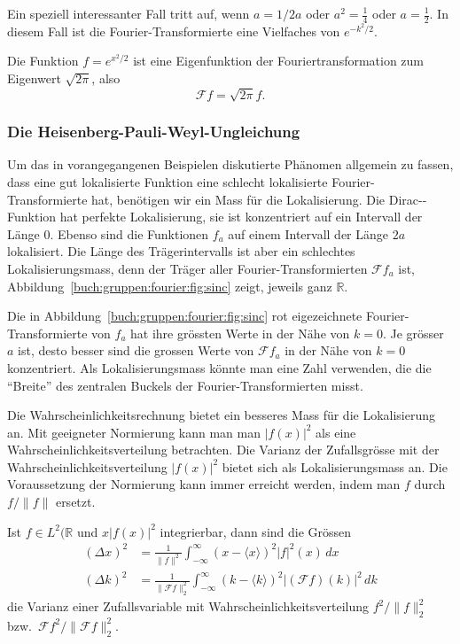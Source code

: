 Ein speziell interessanter Fall tritt auf, wenn $a=1/2a$ oder
$a^2=\frac14$ oder $a=\frac12$.
In diesem Fall ist die Fourier-Transformierte eine Vielfaches von
$e^{-k^2/2}$.

\begin{satz}
\label{buch:gruppen:fourier:satz:gausseigen}
Die Funktion $f=e^{x^2/2}$ ist eine Eigenfunktion der Fouriertransformation
zum Eigenwert $\sqrt{2\pi}$, also
\[
\mathscr{F}f = \sqrt{2\pi} f.
\]
\end{satz}

%
%
\subsubsection{Die Heisenberg-Pauli-Weyl-Ungleichung}
Um das in vorangegangenen Beispielen diskutierte Phänomen allgemein
zu fassen, dass eine gut lokalisierte Funktion eine schlecht lokalisierte
Fourier-Transformierte hat, benötigen wir ein Mass für die Lokalisierung.
Die Dirac-\textdelta-Funktion hat perfekte Lokalisierung, sie ist 
konzentriert auf ein Intervall der Länge $0$.
Ebenso sind die Funktionen $f_a$ auf einem Intervall der Länge $2a$
lokalisiert.
Die Länge des Trägerintervalls ist aber ein schlechtes Lokalisierungsmass,
denn der Träger aller Fourier-Transformierten $\mathscr{F}f_a$ ist,
Abbildung~\ref{buch:gruppen:fourier:fig:sinc} zeigt,
jeweils ganz $\mathbb{R}$.

Die in Abbildung~\ref{buch:gruppen:fourier:fig:sinc}
rot eigezeichnete Fourier-Transformierte von $f_a$ hat ihre grössten 
Werte in der Nähe von $k=0$.
Je grösser $a$ ist, desto besser sind die grossen Werte von $\mathscr{F}f_a$
in der Nähe von $k=0$ konzentriert.
Als Lokalisierungsmass könnte man eine Zahl verwenden, die die ``Breite''
des zentralen Buckels der Fourier-Transformierten misst.

Die Wahrscheinlichkeitsrechnung bietet ein besseres Mass für die
Lokalisierung an.
Mit geeigneter Normierung kann man man $|f(x)|^2$ als eine
Wahrscheinlichkeitsverteilung betrachten.
Die Varianz der Zufallsgrösse mit der Wahrscheinlichkeitsverteilung
$|f(x)|^2$ bietet sich als Lokalisierungsmass an.
Die Voraussetzung der Normierung kann immer erreicht werden, indem man
$f$ durch $f/\|f\|$ ersetzt.


\begin{definition}
Ist $f\in L^2(\mathbb{R}$ und $x|f(x)|^2$ integrierbar, dann sind
die Grössen
\begin{align*}
(\Delta x)^2
&=
\frac{1}{\|f\|^2}
\int_{-\infty}^\infty
(x-\langle x\rangle)^2
|f|^2(x)
\,dx
\\
(\Delta k)^2
&=
\frac{1}{\|\mathscr{F}f\|_2^2}
\int_{-\infty}^\infty
(k-\langle k\rangle)^2
|(\mathscr{F}f)(k)|^2
\,dk
\end{align*}
die Varianz einer Zufallsvariable mit Wahrscheinlichkeitsverteilung
$f^2/\|f\|_2^2$ bzw.~$\mathscr{F}f^2/\|\mathscr{F}f\|_2^2$.
\end{definition}

